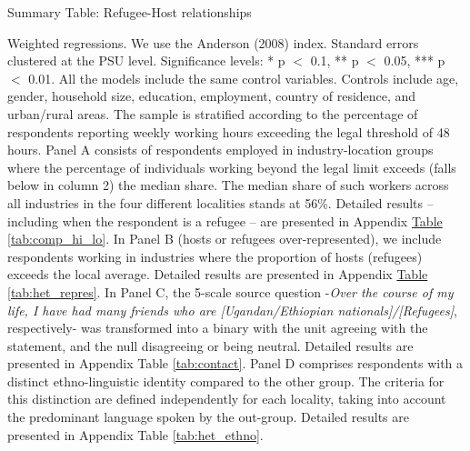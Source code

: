 \documentclass[a4paper,12pt]{article}
\renewcommand{\footnotesize}{\fontsize{8pt}{9pt}\selectfont}
\begin{document}
\begin{table}[H]
	\footnotesize
	\caption{Summary Table: Refugee-Host relationships}
	\label{Summary}
	\centering
	\begin{threeparttable}
			
		\begin{tablenotes}
	\footnotesize
	\item Weighted regressions. We use the Anderson (2008) index. Standard errors clustered at the PSU level. Significance levels: * p $<$ 0.1, ** p $<$ 0.05, *** p $<$ 0.01. All the models include the same control variables. Controls include age, gender, household size, education, employment, country of residence, and urban/rural areas. The sample is stratified according to the percentage of respondents reporting weekly working hours exceeding the legal threshold of 48 hours. Panel A consists of respondents employed in industry-location groups where the percentage of individuals working beyond the legal limit exceeds (falls below in column 2) the median share. The median share of such workers across all industries in the four different localities stands at 56\%. Detailed results -- including when the respondent is a refugee -- are presented in Appendix  \hyperref[tab:comp_hi_lo]{Table} \ref{tab:comp_hi_lo}.  In Panel B (hosts or refugees over-represented), we include respondents working in industries where the proportion of hosts (refugees) exceeds the local average. Detailed results are presented in Appendix  \hyperref[tab:het_repres]{Table} \ref{tab:het_repres}. In Panel C, the 5-scale source question -\textit{Over the course of my life, I have had many friends who are [Ugandan/Ethiopian nationals]/[Refugees]}, respectively- was transformed into a binary with the unit agreeing with the statement, and the null disagreeing or being neutral. Detailed results are presented in Appendix Table \ref{tab:contact}. Panel D comprises respondents with a distinct ethno-linguistic identity compared to the other group. The criteria for this distinction are defined independently for each locality, taking into account the predominant language spoken by the out-group. Detailed results are presented in Appendix Table \ref{tab:het_ethno}.
\end{tablenotes}
\end{threeparttable}
\end{table} 
\vspace{8mm}
\end{document}

